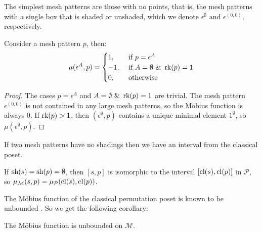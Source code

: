 \documentclass[11pt,a4paper,oneside]{article}
\begin{document}
The simplest mesh patterns are those with no points, that is, the mesh patterns
with a single box that is shaded or unshaded, which we denote
$\epsilon^\emptyset$ and $\epsilon^{(0,0)}$, respectively.
\begin{lem}
Consider a mesh pattern $p$, then:
$$\mu(\epsilon^{A},p)=\begin{cases}
1,&\mbox{ if }p=\epsilon^A \\
-1,&\mbox{ if }A=\emptyset\,\,\&\,\,\operatorname{\textrm{rk}}(p)=1\\
0,&\mbox{ otherwise}
\end{cases}$$
\begin{proof}
The cases $p=\epsilon^A$ and $A=\emptyset\,\,\&\,\,\operatorname{\textrm{rk}}(p)=1$ are trivial. The
mesh pattern $\epsilon^{(0,0)}$ is not contained in any large mesh patterns, so
the M\"obius function is always $0$. If $\operatorname{\textrm{rk}}(p)>1$, then
$(\epsilon^\emptyset,p)$ contains a unique minimal element $1^\emptyset$, so
$\mu(\epsilon^\emptyset,p)$.
\end{proof}
\end{lem}

If two mesh patterns have no shadings then we have an interval from the
classical poset.

\begin{lem}
If $\operatorname{\textrm{sh}}(s)=\operatorname{\textrm{sh}}(p)=\emptyset$, then $[s,p]$ is isomorphic to the interval
$[\operatorname{\textrm{cl}}(s),\operatorname{\textrm{cl}}(p)]$ in $\mathcal{P}$, so $\operatorname{\mu_\mathcal{M}}(s,p)=\operatorname{\mu_\mathcal{P}}(\operatorname{\textrm{cl}}(s),\operatorname{\textrm{cl}}(p))$.
\end{lem}

The M\"obius function of the classical permutation poset is known to be
unbounded \cite{Smith13}. So we get the following corollary:

\begin{cor}
The M\"obius function is unbounded on $\mathcal{M}$.
\end{cor}
\end{document}
